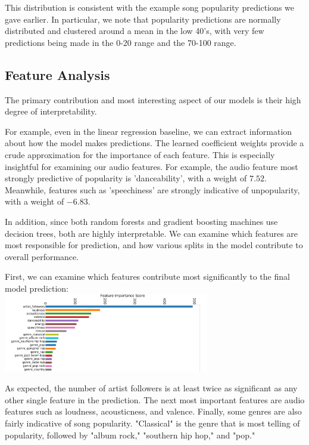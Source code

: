 \documentclass[journal]{IEEEtran}
\begin{document}
This distribution is consistent with the example song popularity predictions we gave earlier. In particular, we note that popularity predictions are normally distributed and clustered around a mean in the low 40's, with very few predictions being made in the 0-20 range and the 70-100 range.


\subsection{Feature Analysis}
The primary contribution and most interesting aspect of our models is their high degree of interpretability.

For example, even in the linear regression baseline, we can extract information about how the model makes predictions. The learned coefficient weights provide a crude approximation for the importance of each feature. This is especially insightful for examining our audio features. For example, the audio feature most strongly predictive of popularity is 'danceability', with a weight of $7.52$. Meanwhile, features such as 'speechiness' are strongly indicative of unpopularity, with a weight of $-6.83$.

In addition, since both random forests and gradient boosting machines use decision trees, both are highly interpretable. We can examine which features are most responsible for prediction, and how various splits in the model contribute to overall performance.

First, we can examine which features contribute most significantly to the final model prediction: \\

\includegraphics[width=9cm]{images/feat_imp.png}

\quad\newline
As expected, the number of artist followers is at least twice as significant as any other single feature in the prediction. The next most important features are audio features such as loudness, acousticness, and valence. Finally, some genres are also fairly indicative of song popularity. "Classical" is the genre that is most telling of popularity, followed by "album rock," "southern hip hop," and "pop."
\end{document}
